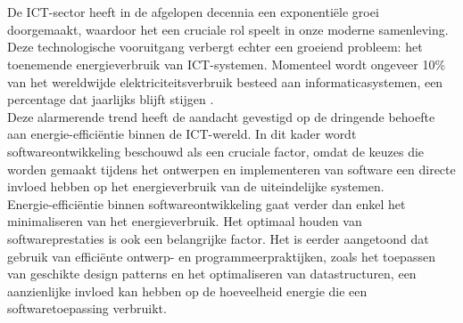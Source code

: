 
\chapter{}%
\label{ch:inleiding}
De ICT-sector heeft in de afgelopen decennia een exponentiële groei doorgemaakt, waardoor het een cruciale rol speelt in onze moderne samenleving. Deze technologische vooruitgang verbergt echter een groeiend probleem: het toenemende energieverbruik van ICT-systemen. Momenteel wordt ongeveer 10\% van het wereldwijde elektriciteitsverbruik besteed aan informaticasystemen, een percentage dat jaarlijks blijft stijgen \autocite{Gelenbe2023}.\\

Deze alarmerende trend heeft de aandacht gevestigd op de dringende behoefte aan energie-efficiëntie binnen de ICT-wereld. In dit kader wordt softwareontwikkeling beschouwd als een cruciale factor, omdat de keuzes die worden gemaakt tijdens het ontwerpen en implementeren van software een directe invloed hebben op het energieverbruik van de uiteindelijke systemen.\\

Energie-efficiëntie binnen softwareontwikkeling gaat verder dan enkel het minimaliseren van het energieverbruik. Het optimaal houden van softwareprestaties is ook een belangrijke factor. Het is eerder aangetoond dat gebruik van efficiënte ontwerp- en programmeerpraktijken, zoals het toepassen van geschikte design patterns en het optimaliseren van datastructuren, een aanzienlijke invloed kan hebben op de hoeveelheid energie die een softwaretoepassing verbruikt.



